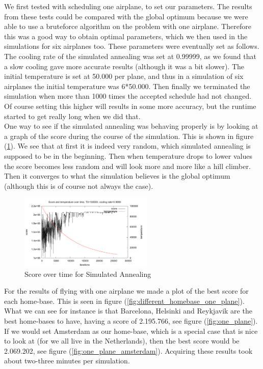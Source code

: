 \documentclass[journal]{IEEEtran}
\begin{document}
We first tested with scheduling one airplane, to set our parameters. The results from these tests could be compared with the global optimum because we were able to use a bruteforce algorithm on the problem with one airplane. Therefore this was a good way to obtain optimal parameters, which we then used in the simulations for six airplanes too. These parameters were eventually set as follows. The cooling rate of the simulated annealing was set at 0.99999, as we found that a slow cooling gave more accurate results (although it was a bit slower). The initial temperature is set at 50.000 per plane, and thus in a simulation of six airplanes the initial temperature was 6*50.000. Then finally we terminated the simulation when more than 1000 times the accepted schedule had not changed. Of course setting this higher will results in some more accuracy, but the runtime started to get really long when we did that.  \\
One way to see if the simulated annealing was behaving properly is by looking at a graph of the score during the course of the simulation. This is shown in figure (\ref{fig:simulated_annealing_score}). We see that at first it is indeed very random, which simulated annealing is supposed to be in the beginning. Then when temperature drops to lower values the score becomes less random and will look more and more like a hill climber. Then it converges to what the simulation believes is the global optimum (although this is of course not always the case). \\
\begin{figure}[H]
\centering
\includegraphics[width=2.5in]{score_over_time}
\caption{Score over time for Simulated Annealing}
\label{fig:simulated_annealing_score}
\end{figure}
For the results of flying with one airplane we made a plot of the best score for each home-base. This is seen in figure (\ref{fig:different_homebase_one_plane}). What we can see for instance is that Barcelona, Helsinki and Reykjavik are the best home-bases to have, having a score of 2.195.766, see figure (\ref{fig:one_plane}). If we would set Amsterdam as our home-base, which is a special case that is nice to look at (for we all live in the Netherlands), then the best score would be 2.069.202, see figure (\ref{fig:one_plane_amsterdam}). Acquiring these results took about two-three minutes per simulation.
\end{document}
